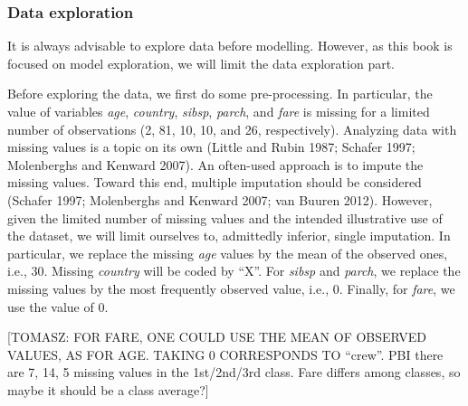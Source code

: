 \documentclass[12pt,]{krantz}
\newenvironment{Shaded}{\begin{snugshade}}{\end{snugshade}}
\newcommand{\CommentTok}[1]{\textcolor[rgb]{0.56,0.35,0.01}{\textit{#1}}}
\newcommand{\DataTypeTok}[1]{\textcolor[rgb]{0.13,0.29,0.53}{#1}}
\newcommand{\DecValTok}[1]{\textcolor[rgb]{0.00,0.00,0.81}{#1}}
\newcommand{\KeywordTok}[1]{\textcolor[rgb]{0.13,0.29,0.53}{\textbf{#1}}}
\newcommand{\NormalTok}[1]{#1}
\newcommand{\OperatorTok}[1]{\textcolor[rgb]{0.81,0.36,0.00}{\textbf{#1}}}
\newcommand{\OtherTok}[1]{\textcolor[rgb]{0.56,0.35,0.01}{#1}}
\newcommand{\StringTok}[1]{\textcolor[rgb]{0.31,0.60,0.02}{#1}}
\theoremstyle{definition}
\theoremstyle{definition}
\theoremstyle{definition}
\theoremstyle{remark}
\begin{document}
\hypertarget{data-exploration}{%
\subsubsection{Data exploration}\label{data-exploration}}

It is always advisable to explore data before modelling. However, as
this book is focused on model exploration, we will limit the data
exploration part.

Before exploring the data, we first do some pre-processing. In
particular, the value of variables \emph{age}, \emph{country},
\emph{sibsp}, \emph{parch}, and \emph{fare} is missing for a limited
number of observations (2, 81, 10, 10, and 26, respectively). Analyzing
data with missing values is a topic on its own (Little and Rubin 1987;
Schafer 1997; Molenberghs and Kenward 2007). An often-used approach is
to impute the missing values. Toward this end, multiple imputation
should be considered (Schafer 1997; Molenberghs and Kenward 2007; van
Buuren 2012). However, given the limited number of missing values and
the intended illustrative use of the dataset, we will limit ourselves
to, admittedly inferior, single imputation. In particular, we replace
the missing \emph{age} values by the mean of the observed ones, i.e.,
30. Missing \emph{country} will be coded by ``X''. For \emph{sibsp} and
\emph{parch}, we replace the missing values by the most frequently
observed value, i.e., 0. Finally, for \emph{fare}, we use the value of
0.

{[}TOMASZ: FOR FARE, ONE COULD USE THE MEAN OF OBSERVED VALUES, AS FOR
AGE. TAKING 0 CORRESPONDS TO ``crew''. PBI there are 7, 14, 5 missing
values in the 1st/2nd/3rd class. Fare differs among classes, so maybe it
should be a class average?{]}

\begin{Shaded}
\end{Shaded}
\end{document}
